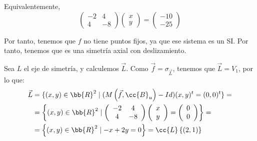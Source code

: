 \begin{ejercicio}
\begin{enumerate}
        Equivalentemente,
        \begin{equation*}
            \left(
            \begin{array}{cc}
                -2&4 \\
                4&-8
            \end{array}
            \right)
            \left(
            \begin{array}{c}
                x\\y
            \end{array}
            \right)
            = \left(
            \begin{array}{c}
                -10\\-25
            \end{array}
            \right)
        \end{equation*}

        Por tanto, tenemos que $f$ no tiene puntos fijos, ya que ese sistema es un SI. Por tanto, tenemos que es una simetría axial con deslizamiento.

        Sea $L$ el eje de simetría, y calculemos $\vec{L}$. Como $\vec{f}=\sigma_{\vec{L}}$, tenemos que $\vec{L}=V_1$, por lo que:
        \begin{equation*}
            \begin{split}
                \vec{L} &= \{ (x,y)\in \bb{R}^2 \mid (M\left(\vec{f}, \cc{B}_u\right) - Id) (x,y)^t = (0,0)^t \} =\\
                &= \left\{ (x,y)\in \bb{R}^2 \mid \left(
                \begin{array}{cc}
                    -2&4 \\
                    4&-8
                \end{array}
                \right)
                \left(
                \begin{array}{c}
                    x\\y
                \end{array}
                \right)
                = \left(
                \begin{array}{c}
                    0\\0
                \end{array}
                \right)
                \right\} =\\
                &= \left\{ (x,y)\in \bb{R}^2 \mid -x+2y=0
                \right\} = \cc{L}\left\{\left(2,1\right)\right\}
            \end{split}
        \end{equation*}


\end{enumerate}
\end{ejercicio}
